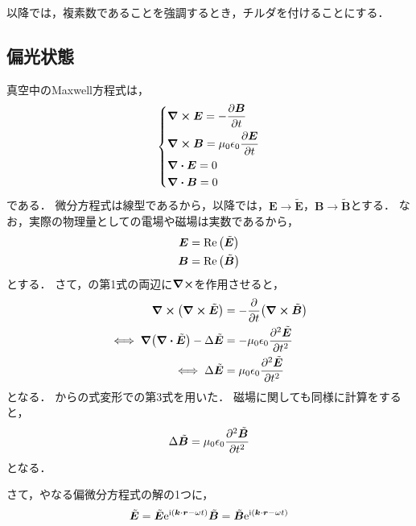 \documentclass{report}
\begin{document}
  以降では，複素数であることを強調するとき，チルダを付けることにする．
  \subsection{偏光状態}
    真空中のMaxwell方程式は，
    \begin{align}
      \begin{dcases}
        \curl \bm{E} = -\pdv{\bm{B}}{t} \\ 
        \curl \bm{B} = \mu_0\epsilon_0\pdv{\bm{E}}{t} \\ 
        \div \bm{E} = 0 \\ \label{maxwell-vacuume}
        \div \bm{B} = 0
      \end{dcases}
    \end{align}
    である．
    微分方程式は線型であるから，以降では，$\bm{E} \to \tilde{\bm{E}}$，$\bm{B} \to \tilde{\bm{B}}$とする．
    なお，実際の物理量としての電場や磁場は実数であるから，
    \begin{align}
      \bm{E} &= \Re\qty(\tilde{\bm{E}}) \\ 
      \bm{B} &= \Re\qty(\tilde{\bm{B}})
    \end{align}
    とする．
    さて，の第1式の両辺に$\curl$を作用させると，
    \begin{align}
      \curl\qty(\curl \tilde{\bm{E}}) &= -\pdv{t}\qty(\curl{\tilde{\bm{B}}}) \\ 
      \iff \grad\qty(\div\tilde{\bm{E}}) - \Delta\tilde{\bm{E}} &= -\mu_0\epsilon_0\pdv[2]{\tilde{\bm{E}}}{t} \label{electro-field-wave-1}\\ 
      \iff \Delta\tilde{\bm{E}} &= \mu_0\epsilon_0\pdv[2]{\tilde{\bm{E}}}{t} \label{electro-field-wave-2} \\ 
    \end{align}
    となる．
    からの式変形での第3式を用いた．
    磁場に関しても同様に計算をすると，
    \begin{align}
      \Delta\tilde{\bm{B}} &= \mu_0\epsilon_0\pdv[2]{\tilde{\bm{B}}}{t} \label{magnetic-field-wave-2} \\ 
    \end{align}
    となる．
    \par
    さて，やなる偏微分方程式の解の1つに，
    \begin{align}
      \tilde{\bm{E}} = \tilde{\bm{E}}\mathrm{e}^{\mathrm{i}(\bm{k}\cdot \bm{r} - \omega t)} \label{electro-field-wave-3}
      \tilde{\bm{B}} = \tilde{\bm{B}}\mathrm{e}^{\mathrm{i}(\bm{k}\cdot \bm{r} - \omega t)} \label{magnetic-field-wave-3}
    \end{align}
\end{document}
